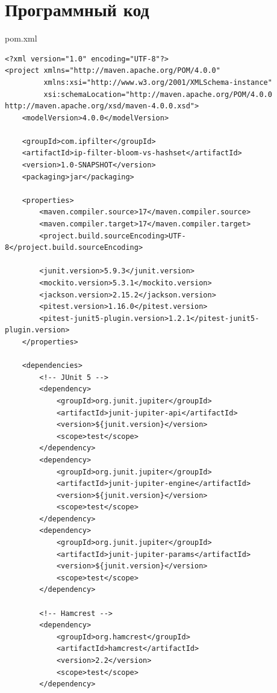 \chapter{Программный код}\label{appendix-MikTeX-TexStudio}							%
pom.xml
\begin{verbatim}
<?xml version="1.0" encoding="UTF-8"?>
<project xmlns="http://maven.apache.org/POM/4.0.0"
         xmlns:xsi="http://www.w3.org/2001/XMLSchema-instance"
         xsi:schemaLocation="http://maven.apache.org/POM/4.0.0 http://maven.apache.org/xsd/maven-4.0.0.xsd">
    <modelVersion>4.0.0</modelVersion>

    <groupId>com.ipfilter</groupId>
    <artifactId>ip-filter-bloom-vs-hashset</artifactId>
    <version>1.0-SNAPSHOT</version>
    <packaging>jar</packaging>

    <properties>
        <maven.compiler.source>17</maven.compiler.source>
        <maven.compiler.target>17</maven.compiler.target>
        <project.build.sourceEncoding>UTF-8</project.build.sourceEncoding>
        
        <junit.version>5.9.3</junit.version>
        <mockito.version>5.3.1</mockito.version>
        <jackson.version>2.15.2</jackson.version>
        <pitest.version>1.16.0</pitest.version>
        <pitest-junit5-plugin.version>1.2.1</pitest-junit5-plugin.version>
    </properties>

    <dependencies>
        <!-- JUnit 5 -->
        <dependency>
            <groupId>org.junit.jupiter</groupId>
            <artifactId>junit-jupiter-api</artifactId>
            <version>${junit.version}</version>
            <scope>test</scope>
        </dependency>
        <dependency>
            <groupId>org.junit.jupiter</groupId>
            <artifactId>junit-jupiter-engine</artifactId>
            <version>${junit.version}</version>
            <scope>test</scope>
        </dependency>
        <dependency>
            <groupId>org.junit.jupiter</groupId>
            <artifactId>junit-jupiter-params</artifactId>
            <version>${junit.version}</version>
            <scope>test</scope>
        </dependency>

        <!-- Hamcrest -->
        <dependency>
            <groupId>org.hamcrest</groupId>
            <artifactId>hamcrest</artifactId>
            <version>2.2</version>
            <scope>test</scope>
        </dependency>


\end{verbatim}
